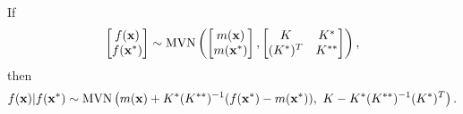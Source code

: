 \begin{theorem}
    \label{thm:cond_mvn}
    If
    $$
        \begin{bmatrix}
            f(\mathbf{x}) \\
            f(\mathbf{x}^\ast)
        \end{bmatrix} \sim \operatorname{MVN}\left(
        \begin{bmatrix}
                m(\mathbf{x}) \\
                m(\mathbf{x}^\ast)
            \end{bmatrix}, \begin{bmatrix}
                K       & K^{*}  \\
                (K^{\ast})^T & K^{**}
            \end{bmatrix}
        \right),
    $$
    then
    $$
        f(\mathbf{x}) | f(\mathbf{x}^\ast)
        \sim \operatorname{MVN}\left(
        m(\mathbf{x}) + K^{*}(K^{**})^{-1}(f(\mathbf{x}^\ast) - m(\mathbf{x}^\ast)), \,\,
        K - K^{\ast}(K^{**})^{-1}(K^{\ast})^T
        \right).
    $$
\end{theorem}
